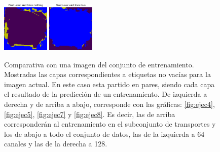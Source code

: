 \begin{figure}[h!]
  \vrule
  \includegraphics[width=0.2\textwidth]{../../modelos-entrenados/unet-nonlocal/ejecucion8/predtrainmid0}
  \vrule
  \includegraphics[width=0.2\textwidth]{../../modelos-entrenados/unet-nonlocal/ejecucion8/predtrainmid6}
  \caption{Comparativa con una imagen del conjunto de entrenamiento. Mostradas las capas correspondientes a etiquetas no vacías para la imagen actual. En este caso esta partido en pares, siendo cada capa el resultado de la predicción de un entrenamiento. De izquierda a derecha y de arriba a abajo, corresponde con las gráficas: \autoref{fig:ejec4}, \autoref{fig:ejec5}, \autoref{fig:ejec7} y \autoref{fig:ejec8}. Es decir, las de arriba corresponderán al entrenamiento en el subconjunto de transportes y los de abajo a todo el conjunto de datos, las de la izquierda a 64 canales y las de la derecha a 128.}
  \label{fig:comparativa3-train}
\end{figure}

